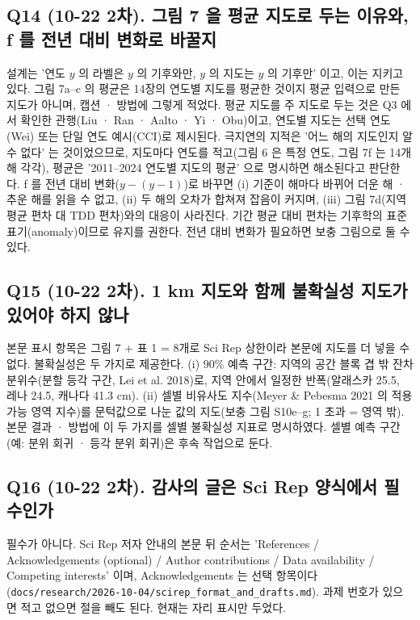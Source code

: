 \documentclass[10pt,a4paper]{article}
\begin{document}
\subsection*{Q14 (10-22 2차). 그림 7 을 평균 지도로 두는 이유와, f 를 전년 대비 변화로 바꿀지}
설계는 '연도 $y$ 의 라벨은 $y$ 의 기후와만, $y$ 의 지도는 $y$ 의 기후만' 이고, 이는 지키고 있다. 그림 7a--c 의 평균은 14장의 연도별 지도를 평균한 것이지 평균 입력으로 만든 지도가 아니며, 캡션 · 방법에 그렇게 적었다. 평균 지도를 주 지도로 두는 것은 Q3 에서 확인한 관행(Liu · Ran · Aalto · Yi · Obu)이고, 연도별 지도는 선택 연도(Wei) 또는 단일 연도 예시(CCI)로 제시된다. 극지연의 지적은 '어느 해의 지도인지 알 수 없다' 는 것이었으므로, 지도마다 연도를 적고(그림 6 은 특정 연도, 그림 7f 는 14개 해 각각), 평균은 '2011--2024 연도별 지도의 평균' 으로 명시하면 해소된다고 판단한다. f 를 전년 대비 변화($y - (y-1)$)로 바꾸면 (i) 기준이 해마다 바뀌어 더운 해 · 추운 해를 읽을 수 없고, (ii) 두 해의 오차가 합쳐져 잡음이 커지며, (iii) 그림 7d(지역 평균 편차 대 TDD 편차)와의 대응이 사라진다. 기간 평균 대비 편차는 기후학의 표준 표기(anomaly)이므로 유지를 권한다. 전년 대비 변화가 필요하면 보충 그림으로 둘 수 있다.

\subsection*{Q15 (10-22 2차). 1 km 지도와 함께 불확실성 지도가 있어야 하지 않나}
본문 표시 항목은 그림 7 + 표 1 = 8개로 Sci Rep 상한이라 본문에 지도를 더 넣을 수 없다. 불확실성은 두 가지로 제공한다. (i) 90\% 예측 구간: 지역의 공간 블록 겹 밖 잔차 분위수(분할 등각 구간, Lei et al. 2018)로, 지역 안에서 일정한 반폭(알래스카 25.5, 레나 24.5, 캐나다 41.3 cm). (ii) 셀별 비유사도 지수(Meyer \& Pebesma 2021 의 적용 가능 영역 지수)를 문턱값으로 나눈 값의 지도(보충 그림 S10e--g; 1 초과 = 영역 밖). 본문 결과 · 방법에 이 두 가지를 셀별 불확실성 지표로 명시하였다. 셀별 예측 구간(예: 분위 회귀 · 등각 분위 회귀)은 후속 작업으로 둔다.

\subsection*{Q16 (10-22 2차). 감사의 글은 Sci Rep 양식에서 필수인가}
필수가 아니다. Sci Rep 저자 안내의 본문 뒤 순서는 'References / Acknowledgements (optional) / Author contributions / Data availability / Competing interests' 이며, Acknowledgements 는 선택 항목이다(\texttt{docs/research/2026-10-04/scirep\_format\_and\_drafts.md}). 과제 번호가 있으면 적고 없으면 절을 빼도 된다. 현재는 자리 표시만 두었다.
\end{document}
